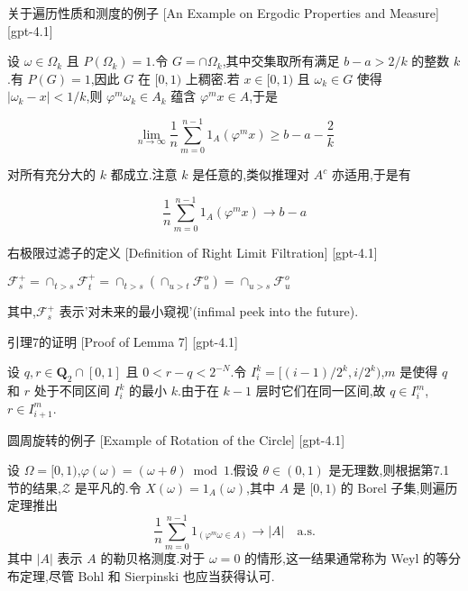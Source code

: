 \documentclass[UTF8]{ctexart}
\begin{document}
    
    
    \begin{xmp}
        {关于遍历性质和测度的例子}
        [An Example on Ergodic Properties and Measure]
        [gpt-4.1]
        
设 $\omega \in \Omega_{k}$ 且 $P(\Omega_{k}) = 1$.令 $G = \cap \Omega_{k}$,其中交集取所有满足 $b - a > 2 / k$ 的整数 $k$.有 $P(G) = 1$,因此 $G$ 在 $[0,1)$ 上稠密.若 $x \in [0,1)$ 且 $\omega_{k} \in G$ 使得 $|\omega_{k} - x| < 1 / k$,则 $\varphi^{m} \omega_{k} \in A_{k}$ 蕴含 $\varphi^{m} x \in A$,于是

\[
\operatorname*{lim}_{n \to \infty} \frac{1}{n} \sum_{m = 0}^{n - 1} 1_{A}(\varphi^{m} x) \geq b - a - \frac{2}{k}
\]

对所有充分大的 $k$ 都成立.注意 $k$ 是任意的,类似推理对 $A^{c}$ 亦适用,于是有

\[
\frac{1}{n} \sum_{m = 0}^{n - 1} 1_{A}(\varphi^{m} x) \to b - a
\]

    \end{xmp}
    
    
    
    \begin{dfn}
        {右极限过滤子的定义}
        [Definition of Right Limit Filtration]
        [gpt-4.1]
        
$\mathcal{F}_s^{+} = \cap_{t > s} \mathcal{F}_t^{+} = \cap_{t > s} \left( \cap_{u > t} \mathcal{F}_u^{o} \right) = \cap_{u > s} \mathcal{F}_u^{o}$

其中,$\mathcal{F}_s^{+}$ 表示'对未来的最小窥视'(infimal peek into the future).

    \end{dfn}
    
    
    
    \begin{lma}
        {引理7的证明}
        [Proof of Lemma 7]
        [gpt-4.1]
        
设 $q, r \in \mathbf{Q}_2 \cap [0, 1]$ 且 $0 < r - q < 2^{-N}$.令 $I_i^k = [(i-1)/2^k, i/2^k)$,$m$ 是使得 $q$ 和 $r$ 处于不同区间 $I_i^k$ 的最小 $k$.由于在 $k-1$ 层时它们在同一区间,故 $q \in I_i^m$, $r \in I_{i+1}^m$.

    \end{lma}
    
    
    
    \begin{xmp}
        {圆周旋转的例子}
        [Example of Rotation of the Circle]
        [gpt-4.1]
        
设 $\Omega = [0, 1)$,$\varphi(\omega) = (\omega + \theta) \bmod 1$.假设 $\theta \in (0, 1)$ 是无理数,则根据第7.1节的结果,$\mathcal{Z}$ 是平凡的.令 $X(\omega) = 1_A(\omega)$,其中 $A$ 是 $[0,1)$ 的 Borel 子集,则遍历定理推出
\[
\frac{1}{n} \sum_{m=0}^{n-1} 1_{(\varphi^m \omega \in A)} \to |A| \quad \mathrm{a.s.}
\]
其中 $|A|$ 表示 $A$ 的勒贝格测度.对于 $\omega=0$ 的情形,这一结果通常称为 Weyl 的等分布定理,尽管 Bohl 和 Sierpinski 也应当获得认可.

    \end{xmp}
    
\end{document}
